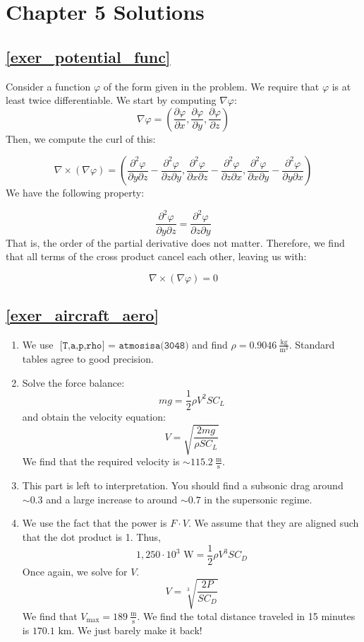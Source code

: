 \documentclass[10pt, openany, titlepage]{book}
\theoremstyle{definition}
\let\oldautoref\autoref
\renewcommand{\autoref}[1]{%
  \begingroup
  \hypersetup{linkcolor=black}%
  \oldautoref{#1}%
  \endgroup
}
\begin{document}
\section{Chapter 5 Solutions}
\subsection*{\texorpdfstring{\autoref{exer_potential_func}}{Potential Function}}

Consider a function $\varphi$ of the form given in the problem. We require that $\varphi$ is at least twice differentiable. We start by computing $\nabla\varphi$:
$$\nabla\varphi=\left(\frac{\partial\varphi}{\partial x},\frac{\partial\varphi}{\partial y},\frac{\partial\varphi}{\partial z}\right)$$
Then, we compute the curl of this:

$$\nabla\times(\nabla\varphi)=\left(\frac{\partial^2\varphi}{\partial y \partial z}-\frac{\partial^2\varphi}{\partial z \partial y},\frac{\partial^2\varphi}{\partial x \partial z}-\frac{\partial^2\varphi}{\partial z \partial x},\frac{\partial^2\varphi}{\partial x \partial y}-\frac{\partial^2\varphi}{\partial y \partial x}\right)$$
We have the following property:

$$\frac{\partial^2\varphi}{\partial y \partial z}=\frac{\partial^2\varphi}{\partial z \partial y}$$
That is, the order of the partial derivative does not matter. Therefore, we find that all terms of the cross product cancel each other, leaving us with:

$$\nabla\times(\nabla\varphi)=0$$

\subsection*{\texorpdfstring{\autoref{exer_aircraft_aero}}{Aircraft Aerodynamics}}

\begin{enumerate}
    \item We use $\texttt{ [T,a,p,rho] = atmosisa(3048)}$ and find $\rho=0.9046\mathrm{\ \frac{kg}{m^3}}$. Standard tables agree to good precision.
    \item Solve the force balance:
$$mg=\frac{1}{2}\rho V^2 SC_L$$
and obtain the velocity equation:
$$V=\sqrt{\frac{2mg}{\rho S C_L}}$$
We find that the required velocity is $\sim115.2 \mathrm{\ \frac{m}{s}}$.
\item This part is left to interpretation.  You should find a subsonic drag around $\sim0.3$ and a large increase to around $\sim0.7$ in the supersonic regime.
\item We use the fact that the power is $F\cdot V$. We assume that they are aligned such that the dot product is 1. Thus,
$$1,250\cdot10^3  \text{ W}=\frac{1}{2}\rho V^3 SC_D$$
Once again, we solve for $V$.
$$V=\sqrt[3]{\frac{2P}{SC_D}}$$
We find that $V_{\text{max}}=189 \mathrm{\ \frac{m}{s}}$. We find the total distance traveled in 15 minutes is $170.1  \text{ km}$. We just barely make it back!
\end{enumerate}
\end{document}
